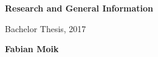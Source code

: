 \renewcommand*{\thesection}{\arabic{section}}
\newcommand*{\xchapter}{\setcounter{section}{0}\addchap}
%



\begin{titlepage}
       \begin{center}
             \begin{huge}
                   \textbf{Research and General Information}
             \end{huge}
       \end{center}
       \begin{center}
             \begin{large}
                  Bachelor Thesis, 2017
             \end{large}
       \end{center}
       \begin{center}
             \begin{large}
                 \textbf{Fabian Moik}
             \end{large}
       \end{center}
\end{titlepage}





%    
%    

